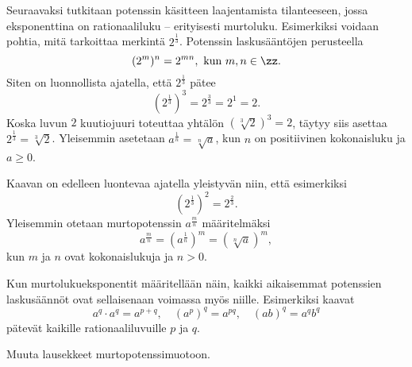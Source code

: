Seuraavaksi tutkitaan potenssin käsitteen laajentamista tilanteeseen, jossa eksponenttina on rationaaliluku – erityisesti murtoluku. Esimerkiksi voidaan pohtia, mitä tarkoittaa merkintä $2^\frac{1}{3}$. Potenssin laskusääntöjen perusteella
\[
(2^{m})^n = 2^{mn},\textrm{ kun }m,n\in \zz.
\]
Siten on luonnollista ajatella, että  $2^\frac{1}{3}$ pätee
\[
(2^\frac{1}{3})^3 = 2^\frac{3}{3} = 2^1=2.
\]
Koska luvun $2$ kuutiojuuri toteuttaa yhtälön $(\sqrt[3]{2})^3=2$, täytyy siis asettaa $2^\frac{1}{3}=\sqrt[3]{2}$. Yleisemmin asetetaan $a^\frac{1}{n} =\sqrt[n]{a}$, kun $n$ on positiivinen kokonaisluku ja $a\ge 0$.

Kaavan on edelleen luontevaa ajatella yleistyvän niin, että esimerkiksi
\[
(2^{\frac{1}{3}})^2 = 2^{\frac{2}{3}}.
\]
Yleisemmin otetaan murtopotenssin $a^\frac{m}{n}$ määritelmäksi
\[
a^\frac{m}{n} = (a^{\frac{1}{n}})^m = (\sqrt[n]{a})^m,
\]
kun $m$ ja $n$ ovat kokonaislukuja ja $n>0$. 


Kun murtolukueksponentit määritellään näin, kaikki aikaisemmat potenssien laskusäännöt ovat sellaisenaan voimassa myös niille. Esimerkiksi kaavat
\[ a^q\cdot a^q = a^{p+q}, \quad (a^p)^q = a^{pq}, \quad (ab)^q=a^qb^q \]
pätevät kaikille rationaaliluvuille $p$ ja $q$.


\begin{esimerkki}
Muuta lausekkeet murtopotenssimuotoon.
	\begin{esimratk}
	\end{esimratk}
\end{esimerkki}

